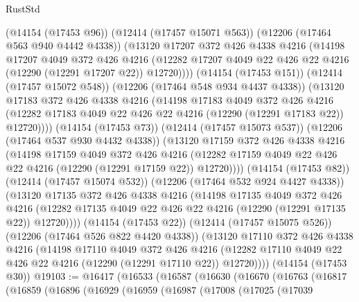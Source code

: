 \begin{lexlean}{RustStd}
\begin{coremodule}
              (@14154 (@17453 @96))
              (@12414 (@17457 @15071 @563))
              (@12206 (@17464 @563 @940 @4442 @4338))
              (@13120
                @17207
                @372
                @426
                @4338
                @4216
                (@14198
                  @17207
                  @4049
                  @372
                  @426
                  @4216
                  (@12282 @17207 @4049 @22 @426 @22 @4216 (@12290 (@12291 @17207 @22)) @12720))))
            (@14154 (@17453 @151))
            (@12414 (@17457 @15072 @548))
            (@12206 (@17464 @548 @934 @4437 @4338))
            (@13120
              @17183
              @372
              @426
              @4338
              @4216
              (@14198
                @17183
                @4049
                @372
                @426
                @4216
                (@12282 @17183 @4049 @22 @426 @22 @4216 (@12290 (@12291 @17183 @22)) @12720))))
          (@14154 (@17453 @73))
          (@12414 (@17457 @15073 @537))
          (@12206 (@17464 @537 @930 @4432 @4338))
          (@13120
            @17159
            @372
            @426
            @4338
            @4216
            (@14198
              @17159
              @4049
              @372
              @426
              @4216
              (@12282 @17159 @4049 @22 @426 @22 @4216 (@12290 (@12291 @17159 @22)) @12720))))
        (@14154 (@17453 @82))
        (@12414 (@17457 @15074 @532))
        (@12206 (@17464 @532 @924 @4427 @4338))
        (@13120
          @17135
          @372
          @426
          @4338
          @4216
          (@14198
            @17135
            @4049
            @372
            @426
            @4216
            (@12282 @17135 @4049 @22 @426 @22 @4216 (@12290 (@12291 @17135 @22)) @12720))))
      (@14154 (@17453 @22))
      (@12414 (@17457 @15075 @526))
      (@12206 (@17464 @526 @822 @4420 @4338))
      (@13120
        @17110
        @372
        @426
        @4338
        @4216
        (@14198
          @17110
          @4049
          @372
          @426
          @4216
          (@12282 @17110 @4049 @22 @426 @22 @4216 (@12290 (@12291 @17110 @22)) @12720))))
    (@14154 (@17453 @30))
@19103 := @16417
    (@16533
      (@16587
        (@16630
          (@16670
            (@16763
              (@16817
                (@16859
                  (@16896
                    (@16929
                      (@16959
                        (@16987
                          (@17008
                            (@17025
                              (@17039

\end{coremodule}
\end{lexlean}
